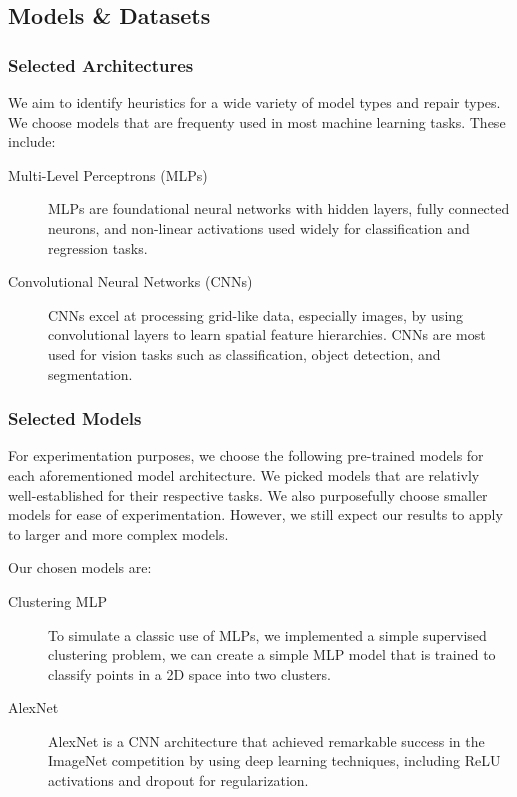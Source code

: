 \documentclass{article}
\begin{document}
\subsection{Models \& Datasets}

\subsubsection{Selected Architectures}
We aim to identify heuristics for a wide variety of model types and repair types.
We choose models that are frequenty used in most machine learning tasks.
These include:

\begin{description}
	\item[Multi-Level Perceptrons (MLPs)] {
		MLPs are foundational neural networks with hidden layers, fully connected neurons, and non-linear activations used widely for classification and regression tasks.
		}
	\item[Convolutional Neural Networks (CNNs)] {
		CNNs excel at processing grid-like data, especially images, by using convolutional layers to learn spatial feature hierarchies.
		CNNs are most used for vision tasks such as classification, object detection, and segmentation.
		}
\end{description}

\subsubsection{Selected Models}

For experimentation purposes, we choose the following pre-trained models for each aforementioned model architecture.
We picked models that are relativly well-established for their respective tasks.
We also purposefully choose smaller models for ease of experimentation.
However, we still expect our results to apply to larger and more complex models.

Our chosen models are:
\begin{description}
	\item[Clustering MLP] {
		To simulate a classic use of MLPs, we implemented a simple supervised clustering problem, we can create a simple MLP model that is trained to classify points in a 2D space into two clusters.
		}
	\item[AlexNet \cite{alexnet}] AlexNet is a CNN architecture that achieved remarkable success in the ImageNet competition by using deep learning techniques, including ReLU activations and dropout for regularization.
\end{description}
\end{document}
